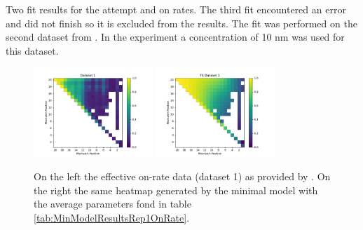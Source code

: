 \begin{table}
\begin{center}
\caption{Two fit results for the attempt and on rates. The third fit encountered an error and did not finish so it is excluded from the results. The fit was performed on the second dataset from \cite{PNAS}. In the experiment a concentration of 10 nm was used for this dataset. }
\label{tab:MinModelResultsRep2OnRate}
\end{center}
\end{table}

\begin{figure}
\begin{center}
\includegraphics[width=0.4\textwidth]{images/OnRateDataset1}
\includegraphics[width=0.4\textwidth]{images/OnRateFitset1}
\caption{On the left the effective on-rate data (dataset 1) as provided by \cite{PNAS}. On the right the same heatmap generated by the minimal model with the average parameters fond in table \ref{tab:MinModelResultsRep1OnRate}.}
\label{fig:OnRateHMRep1}
\end{center}
\end{figure}


